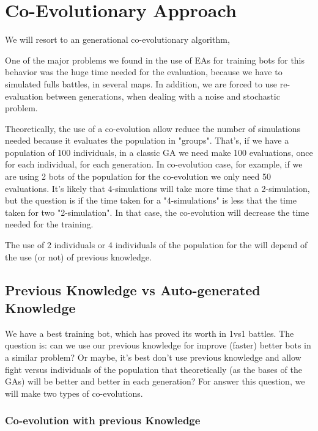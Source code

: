\documentclass{llncs}
\begin{document}
%
\section{Co-Evolutionary Approach}
\label{sec:co-genebot}

We will resort to an generational co-evolutionary algorithm, 

One of the major problems we found in the use of EAs for training bots for this behavior was the huge time needed for the evaluation, because we have to simulated fulls battles, in several maps. In addition, we are forced to use re-evaluation between generations, when dealing with a noise and stochastic problem.

Theoretically, the use of a co-evolution allow reduce the number of simulations needed because it evaluates the population in "groups". That's, if we have a population of 100 individuals, in a classic GA we need make 100 evaluations, once for each individual, for each generation. In co-evolution case, for example, if we are using 2 bots of the population for the co-evolution we only need 50 evaluations. It's likely that 4-simulations will take more time that a 2-simulation, but the question is if the time taken for a "4-simulations" is less that the time taken for two "2-simulation". In that case, the co-evolution will decrease the time needed for the training.

The use of 2 individuals or 4 individuals of the population for the  will depend of the use (or not) of previous knowledge. 

\subsection{Previous Knowledge vs Auto-generated Knowledge}
\label{sec:knowledge}

We have a best training bot, which has proved its worth in 1vs1 battles. The question is: can we use our previous knowledge for improve (faster) better bots in a similar problem? Or maybe, it's best don't use previous knowledge and allow fight versus individuals of the population that theoretically (as the bases of the GAs) will be better and better in each generation? For answer this question, we will make two types of co-evolutions.

\subsubsection{Co-evolution with previous Knowledge}
\end{document}
